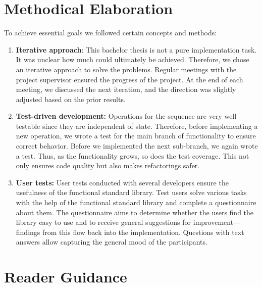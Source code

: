 \section*{Methodical Elaboration} %
\label{sec:intro_methoical_elaboration}
To achieve essential goals we followed certain concepts and methods:
\begin{enumerate}
  \item \textbf{Iterative approach}: This bachelor thesis is not a pure
    implementation task. It was unclear how much could ultimately be achieved.
    Therefore, we chose an iterative approach to solve the problems. Regular
    meetings with the project supervisor ensured the progress of the project.
    At the end of each meeting, we discussed the next iteration, and the
    direction was slightly adjusted based on the prior results.
  \item \textbf{Test-driven development:} Operations for the sequence are very
    well testable since they are independent of state. Therefore, before
    implementing a new operation, we wrote a test for the main branch of
    functionality to ensure correct behavior. Before we implemented the next
    sub-branch, we again wrote a test. Thus, as the functionality grows, so
    does the test coverage. This not only ensures code quality but also makes
    refactorings safer.
    \item  \textbf{User tests:} User tests conducted
    with several developers ensure the usefulness of the functional standard
    library. Test users solve various tasks with the help of the functional
    standard library and complete a questionnaire about them. The questionnaire
    aims to determine whether the users find the library easy to use and to
    receive general suggestions for improvement—findings from this flow back
    into the implementation. Questions with text answers allow capturing the
    general mood of the participants.
\end{enumerate}

\section*{Reader Guidance} %
\label{sec:Reader Guidance}

